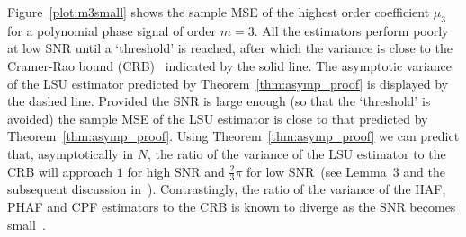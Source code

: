 \documentclass[journal]{IEEEtran}
\begin{document}
Figure~\ref{plot:m3small} shows the sample MSE of the highest order coefficient $\mu_3$ for a polynomial phase signal of order $m=3$.  All the estimators perform poorly at low SNR until a `threshold' is reached, after which the variance is close to the Cramer-Rao bound (CRB)~\cite{Peleg1991_CRB_PPS_1991} indicated by the solid line.  The asymptotic variance of the LSU estimator predicted by Theorem~\ref{thm:asymp_proof} is displayed by the dashed line.  Provided the SNR is large enough (so that the `threshold' is avoided) the sample MSE of the LSU estimator is close to that predicted by Theorem~\ref{thm:asymp_proof}.  Using Theorem~\ref{thm:asymp_proof} we can predict that, asymptotically in $N$, the ratio of the variance of the LSU estimator to the CRB will approach $1$ for high SNR and $\tfrac{2}{3}\pi$ for low SNR~(see Lemma~3 and the subsequent discussion in~\cite{Quinn2009_dasp_phase_only_information_loss}).  Contrastingly, the ratio of the variance of the HAF, PHAF and CPF estimators to the CRB is known to diverge as the SNR becomes small~\cite{Porat_asympt_HAF_DPT_1996,Oshea_cpf_2004,Djurovic_haf_cpf_2012}.  %
\end{document}
